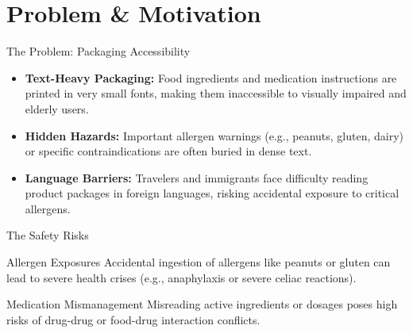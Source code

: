 \section{Problem \& Motivation}

\begin{frame}{The Problem: Packaging Accessibility}
    \begin{itemize}
        \item \textbf{Text-Heavy Packaging:} Food ingredients and medication instructions are printed in very small fonts, making them inaccessible to visually impaired and elderly users.
        \item \textbf{Hidden Hazards:} Important allergen warnings (e.g., peanuts, gluten, dairy) or specific contraindications are often buried in dense text.
        \item \textbf{Language Barriers:} Travelers and immigrants face difficulty reading product packages in foreign languages, risking accidental exposure to critical allergens.
    \end{itemize}
\end{frame}

\begin{frame}{The Safety Risks}
    \begin{block}{Allergen Exposures}
        Accidental ingestion of allergens like peanuts or gluten can lead to severe health crises (e.g., anaphylaxis or severe celiac reactions).
    \end{block}
    \begin{block}{Medication Mismanagement}
        Misreading active ingredients or dosages poses high risks of drug-drug or food-drug interaction conflicts.
    \end{block}
\end{frame}
